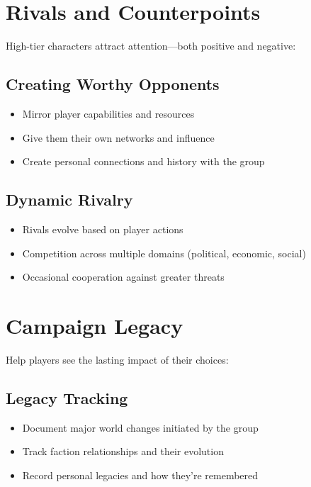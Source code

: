 \section{Rivals and Counterpoints}

High-tier characters attract attention---both positive and negative:

\subsection*{Creating Worthy Opponents}

\begin{itemize}
    \item Mirror player capabilities and resources
    \item Give them their own networks and influence
    \item Create personal connections and history with the group
\end{itemize}

\subsection*{Dynamic Rivalry}

\begin{itemize}
    \item Rivals evolve based on player actions
    \item Competition across multiple domains (political, economic, social)
    \item Occasional cooperation against greater threats
\end{itemize}

\section{Campaign Legacy}

Help players see the lasting impact of their choices:

\subsection*{Legacy Tracking}

\begin{itemize}
    \item Document major world changes initiated by the group
    \item Track faction relationships and their evolution
    \item Record personal legacies and how they're remembered
\end{itemize}

